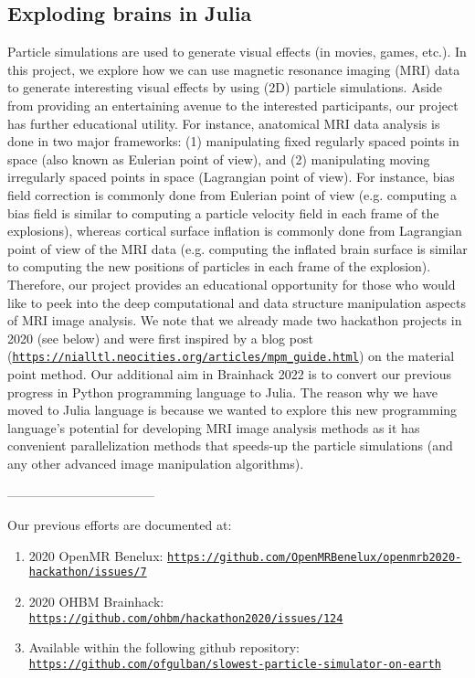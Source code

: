\documentclass[../main.tex]{subfiles}
\begin{document}
\subsection{Exploding brains in Julia}\label{sec:explodingbrains}


Particle simulations are used to generate visual effects (in movies, games, etc.). In this project, we explore how we can use magnetic resonance imaging (MRI) data to generate interesting visual effects by using (2D) particle simulations. Aside from providing an entertaining avenue to the interested participants, our project has further educational utility. For instance, anatomical MRI data analysis is done in two major frameworks: (1) manipulating fixed regularly spaced points in space (also known as Eulerian point of view), and (2) manipulating moving irregularly spaced points in space (Lagrangian point of view). For instance, bias field correction is commonly done from Eulerian point of view (e.g. computing a bias field is similar to computing a particle velocity field in each frame of the explosions), whereas cortical surface inflation is commonly done from Lagrangian point of view of the MRI data (e.g. computing the inflated brain surface is similar to computing the new positions of particles in each frame of the explosion). Therefore, our project provides an educational opportunity for those who would like to peek into the deep computational and data structure manipulation aspects of MRI image analysis. We note that we already made two hackathon projects in 2020 (see below) and were first inspired by a blog post (\texttt{\url{https://nialltl.neocities.org/articles/mpm_guide.html}}) on the material point method\supercite{Jiang1965, Love2006, Stomakhin2013a}. Our additional aim in Brainhack 2022 is to convert our previous progress in Python programming language to Julia. The reason why we have moved to Julia language is because we wanted to explore this new programming language's potential for developing MRI image analysis methods as it has convenient parallelization methods that speeds-up the particle simulations (and any other advanced image manipulation algorithms).

-----------------------------------

Our previous efforts are documented at:
\begin{enumerate}
    \item 2020 OpenMR Benelux: \texttt{\url{https://github.com/OpenMRBenelux/openmrb2020-hackathon/issues/7}} 
    \item 2020 OHBM Brainhack: \texttt{\url{https://github.com/ohbm/hackathon2020/issues/124}}
    \item Available within the following github repository: \texttt{\url{https://github.com/ofgulban/slowest-particle-simulator-on-earth}}    
\end{enumerate}
\end{document}
